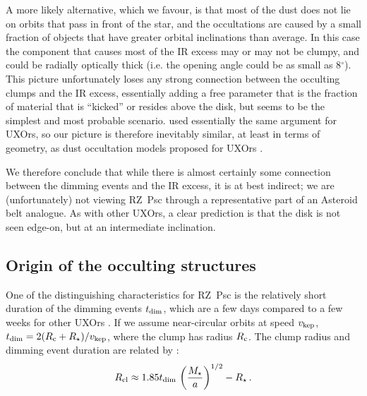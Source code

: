 \documentclass[useAMS,usenatbib,usegraphicx]{mn2e}
\begin{document}
A more likely alternative, which we favour, is that most of the dust does not lie on
orbits that pass in front of the star, and the occultations are caused by a small
fraction of objects that have greater orbital inclinations than average. In this case the
component that causes most of the IR excess may or may not be clumpy, and could be
radially optically thick (i.e. the opening angle could be as small as 8$^\circ$). This
picture unfortunately loses any strong connection between the occulting clumps and the IR
excess, essentially adding a free parameter that is the fraction of material that is
``kicked'' or resides above the disk, but seems to be the simplest and most probable
scenario. \citet{2003ApJ...594L..47D} used essentially the same argument for UXOrs, so
our picture is therefore inevitably similar, at least in terms of geometry, as dust
occultation models proposed for UXOrs
\citep[e.g.][]{1997ApJ...491..885N,2000A&A...364..633N,2003ApJ...594L..47D}.

We therefore conclude that while there is almost certainly some connection between the
dimming events and the IR excess, it is at best indirect; we are (unfortunately) not
viewing RZ~Psc through a representative part of an Asteroid belt analogue. As with other
UXOrs, a clear prediction is that the disk is not seen edge-on, but at an intermediate
inclination.

\subsection{Origin of the occulting structures}\label{ss:orig}

One of the distinguishing characteristics for RZ~Psc is the relatively short duration of
the dimming events $t_{\rm dim}$, which are a few days compared to a few weeks for other
UXOrs \citep[e.g.][]{1999AJ....118.1043H,2010A&A...511L...9C}. If we assume near-circular
orbits at speed $v_{\rm kep}$, $t_{\rm dim}=2(R_{\rm c}+R_\star)/v_{\rm kep}$, where the
clump has radius $R_{\rm c}$.  The clump radius and dimming event duration are related by
\citep[e.g.][]{2016ApJ...816...69A,2016MNRAS.457.3988B}:
\begin{equation}
  R_{\rm cl} \approx 1.85 t_{\rm dim} \, \left( \frac{M_\star}{a} \right)^{1/2} - R_\star \, .
\end{equation}

\end{document}
